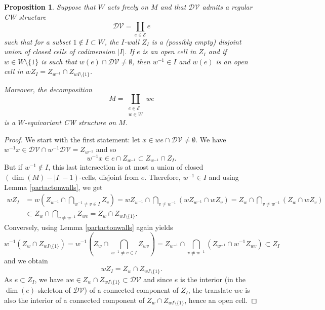 \documentclass[11pt,twoside]{amsart}
\theoremstyle{plain}
\newtheorem{prop}{Proposition}[section]
\begin{document}
\begin{prop}\label{cellsfromDV}
Suppose that $W$ acts freely on $M$ and that $\mathcal{DV}$ admits a regular CW structure
\[\mathcal{DV}=\coprod_{e\in\mathcal{E}}e\]
such that for a subset $1\notin I\subset W$, the $I$-wall $Z_I$ is a (possibly empty) disjoint union of closed cells of codimension $|I|$. If $e$ is an open cell in $Z_I$ and if $w\in W\setminus\{1\}$ is such that $w(e)\cap\mathcal{DV}\ne\emptyset$, then $w^{-1}\in I$ and $w(e)$ is an open cell in $wZ_I=Z_{w^{-1}}\cap Z_{wI\setminus\{1\}}$.

Moreover, the decomposition
\[M=\coprod_{\substack{e\in\mathcal{E} \\ w\in W}}we\]
is a $W$-equivariant CW structure on $M$.
\end{prop}
\begin{proof}
We start with the first statement: let $x\in we\cap\mathcal{DV}\ne\emptyset$. We have $w^{-1}x\in\mathcal{DV}\cap w^{-1}\mathcal{DV}=Z_{w^{-1}}$ and so 
\[w^{-1}x\in e\cap Z_{w^{-1}}\subset Z_{w^{-1}}\cap Z_I.\]
But if $w^{-1}\notin I$, this last intersection is at most a union of closed $(\dim(M)-|I|-1)$-cells, disjoint from $e$. Therefore, $w^{-1}\in I$ and using Lemma \ref{partactonwalls}, we get
\begin{align*}
wZ_I&=w\left(Z_{w^{-1}}\cap\bigcap_{w^{-1}\ne v\in I}Z_v\right)=wZ_{w^{-1}}\cap\bigcap_{v\ne w^{-1}}(wZ_{w^{-1}}\cap wZ_v)=Z_w\cap\bigcap_{v\ne w^{-1}}(Z_w\cap wZ_v) \\
&\subset Z_w\cap\bigcap_{v\ne w^{-1}}Z_{wv}=Z_w\cap Z_{wI\setminus\{1\}}.
\end{align*}
Conversely, using Lemma \ref{partactonwalls} again yields
\[w^{-1}(Z_w\cap Z_{wI\setminus\{1\}})=w^{-1}\left(Z_w\cap\bigcap_{w^{-1}\ne v\in I}Z_{wv}\right)=Z_{w^{-1}}\cap\bigcap_{v\ne w^{-1}}(Z_{w^{-1}}\cap w^{-1}Z_{wv})\subset Z_I\]
and we obtain
\[wZ_I=Z_w\cap Z_{wI\setminus\{1\}}.\]
As $e\subset Z_I$, we have $we\in Z_w\cap Z_{wI\setminus\{1\}}\subset\mathcal{DV}$ and since $e$ is the interior (in the $\dim(e)$-skeleton of $\mathcal{DV}$) of a connected component of $Z_I$, the translate $we$ is also the interior of a connected component of $Z_w\cap Z_{wI\setminus\{1\}}$, hence an open cell.


\end{proof}
\end{document}
